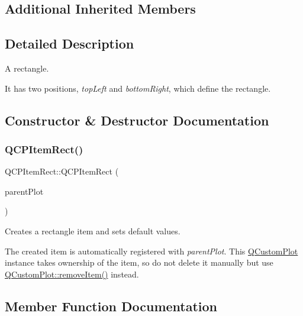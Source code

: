 \subsection*{Additional Inherited Members}


\subsection{Detailed Description}
A rectangle. 

 It has two positions, {\itshape top\+Left} and {\itshape bottom\+Right}, which define the rectangle. 

\subsection{Constructor \& Destructor Documentation}
\mbox{\label{class_q_c_p_item_rect_a412ad1579f7a1fba453d0fa28c496cbc}} 
\subsubsection{\texorpdfstring{Q\+C\+P\+Item\+Rect()}{QCPItemRect()}}
{\footnotesize\ttfamily Q\+C\+P\+Item\+Rect\+::\+Q\+C\+P\+Item\+Rect (\begin{DoxyParamCaption}\item[{\hyperlink{class_q_custom_plot}{Q\+Custom\+Plot} $\ast$}]{parent\+Plot }\end{DoxyParamCaption})\hspace{0.3cm}{\ttfamily [explicit]}}

Creates a rectangle item and sets default values.

The created item is automatically registered with {\itshape parent\+Plot}. This \hyperlink{class_q_custom_plot}{Q\+Custom\+Plot} instance takes ownership of the item, so do not delete it manually but use \hyperlink{class_q_custom_plot_ae04446557292551e8fb6e2c106e1848d}{Q\+Custom\+Plot\+::remove\+Item()} instead. 

\subsection{Member Function Documentation}
\mbox{\label{class_q_c_p_item_rect_a2e68621b75bae4da6ae0ab2cdd0dd733}} 
